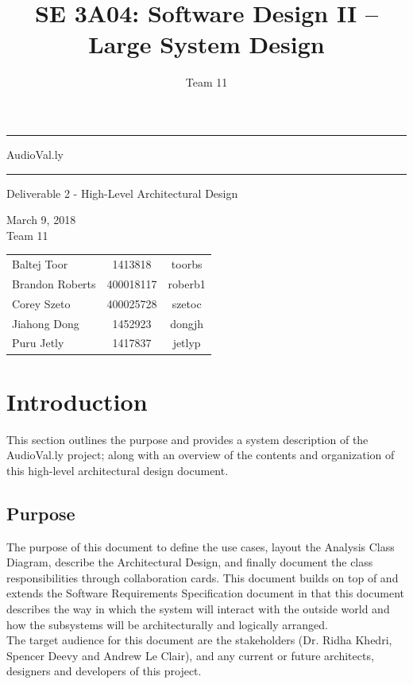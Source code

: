 \documentclass[]{article}
\title{SE 3A04: Software Design II -- Large System Design}
\author{Team 11}
\date{}
\begin{document}
\maketitle
\begin{center}
\hrule
	\vspace{0.2in}
\huge AudioVal.ly
	\vspace{0.05in}
\hrule
	\vspace{0.2in}
\huge  Deliverable 2 - High-Level Architectural Design
	\vspace{0.2in}

\large March 9, 2018
\\
	\vspace{1in}
			\large Team 11
\end{center}
\begin{minipage}[c]{\linewidth}
			\large
			\centering
			\begin{tabular}{l c c}
				Baltej Toor & 1413818 & toorbs \\
				Brandon Roberts & 400018117 & roberb1 \\
				Corey Szeto & 400025728 & szetoc \\
				Jiahong Dong & 1452923 & dongjh \\
				Puru Jetly & 1417837 & jetlyp \\
			\end{tabular}
\end{minipage}	
\newpage

\tableofcontents
\newpage
\section{Introduction}
\label{sec:introduction}

This section outlines the purpose and provides a system description of the AudioVal.ly project; along with an overview of the contents and organization of this high-level architectural design document.
 


\subsection{Purpose}
\label{sub:purpose}
The purpose of this document to define the use cases, layout the Analysis Class Diagram, describe the Architectural Design, and finally document the class responsibilities through collaboration cards. This document builds on top of and extends the Software Requirements Specification document in that this document describes the way in which the system will interact with the outside world and how the subsystems will be architecturally and logically arranged. \\
The target audience for this document are the stakeholders (Dr. Ridha Khedri, Spencer Deevy and Andrew Le Clair), and any current or future architects, designers and developers of this project.
\end{document}
